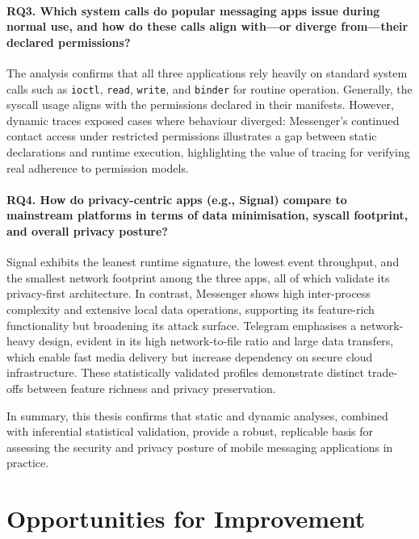 \documentclass[a4paper,12pt]{report}
\begin{document}
\paragraph{\textbf{RQ3.} Which system calls do popular messaging apps issue during normal use, and how do these calls align with—or diverge from—their declared permissions?}

The analysis confirms that all three applications rely heavily on standard system calls such as \texttt{ioctl}, \texttt{read}, \texttt{write}, and \texttt{binder} for routine operation. Generally, the syscall usage aligns with the permissions declared in their manifests. However, dynamic traces exposed cases where behaviour diverged: Messenger's continued contact access under restricted permissions illustrates a gap between static declarations and runtime execution, highlighting the value of tracing for verifying real adherence to permission models.

\paragraph{\textbf{RQ4.} How do privacy-centric apps (e.g., Signal) compare to mainstream platforms in terms of data minimisation, syscall footprint, and overall privacy posture?}

Signal exhibits the leanest runtime signature, the lowest event throughput, and the smallest network footprint among the three apps, all of which validate its privacy-first architecture. In contrast, Messenger shows high inter-process complexity and extensive local data operations, supporting its feature-rich functionality but broadening its attack surface. Telegram emphasises a network-heavy design, evident in its high network-to-file ratio and large data transfers, which enable fast media delivery but increase dependency on secure cloud infrastructure. These statistically validated profiles demonstrate distinct trade-offs between feature richness and privacy preservation.

In summary, this thesis confirms that static and dynamic analyses, combined with inferential statistical validation, provide a robust, replicable basis for assessing the security and privacy posture of mobile messaging applications in practice.

\section{Opportunities for Improvement}
\end{document}
